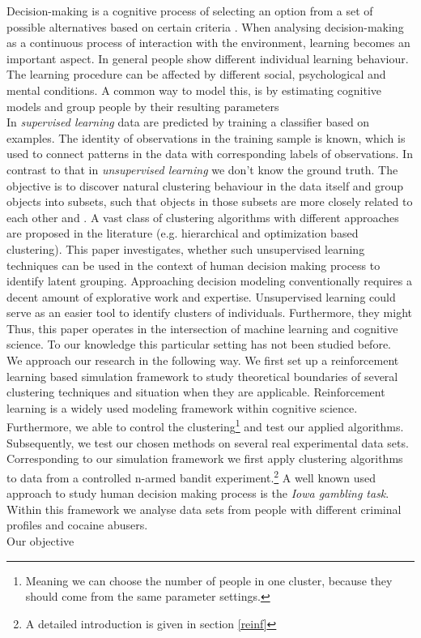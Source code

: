 \documentclass[12pt,a4paper,bibliography=totocnumbered,listof=totocnumbered]{scrartcl}
\begin{document}
Decision-making is a cognitive process of selecting an option from a set of possible alternatives based on certain criteria \cite{Wang2007}. When analysing decision-making as a continuous process of interaction with the environment, learning becomes an important aspect. In general people show different individual learning behaviour. The learning procedure can be affected by different social, psychological and mental conditions. A common way to model this, is by estimating cognitive models and group people by their resulting parameters\\
In \textit{supervised learning} data are predicted by training a classifier based on examples. The identity of observations in the training sample is known, which is used to connect patterns in the data with corresponding labels of observations. In contrast to that in \textit{unsupervised learning} we don't know the ground truth. The objective is to discover natural clustering behaviour in the data itself and group objects into subsets, such that objects in those subsets are more closely related to each other \cite{Murphy2012} and \cite{hastie}. A vast class of clustering algorithms with different approaches are proposed in the literature (e.g. hierarchical and optimization based clustering). This paper investigates, whether such unsupervised learning techniques can be used in the context of human decision making process to identify latent grouping. Approaching decision modeling conventionally requires a decent amount of explorative work and expertise. Unsupervised learning could serve as an easier tool to identify clusters of individuals. Furthermore, they might Thus, this paper operates in the intersection of machine learning and cognitive science. To our knowledge this particular setting has not been studied before.\\
We approach our research in the following way. We first set up a reinforcement learning based simulation framework to study theoretical boundaries of several clustering techniques and situation when they are applicable. Reinforcement learning is a widely used modeling framework within cognitive science. Furthermore, we able to control the clustering\footnote{Meaning we can choose the number of people in one cluster, because they should come from the same parameter settings.} and test our applied algorithms. 
Subsequently, we test our chosen methods on several  real experimental data sets. Corresponding to our simulation framework we first apply clustering algorithms to data from a controlled n-armed bandit experiment.\footnote{A detailed introduction is given in section \ref{reinf}} A well known used approach to study human decision making process is the \textit{Iowa gambling task}. Within this framework we analyse data sets from people with different criminal profiles and cocaine abusers.\\
Our objective
\end{document}

